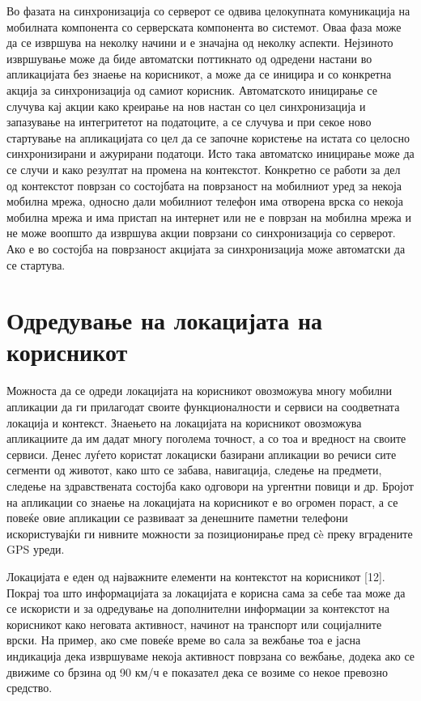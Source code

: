 Во фазата на синхронизација со серверот се одвива целокупната комуникација на
мобилната компонента со серверската компонента во системот. Оваа фаза може да се
извршува на неколку начини и е значајна од неколку аспекти. Нејзиното извршување
може да биде автоматски поттикнато од одредени настани во апликацијата без
знаење на корисникот, а може да се иницира и со конкретна акција за
синхронизација од самиот корисник. Автоматското иницирање се случува кај акции
како креирање на нов настан со цел синхронизација и запазување на интегритетот
на податоците, а се случува и при секое ново стартување на апликацијата со цел
да се започне користење на истата со целосно синхронизирани и ажурирани
податоци. Исто така автоматско иницирање може да се случи и како резултат на
промена на контекстот. Конкретно се работи за дел од контекстот поврзан со
состојбата на поврзаност на мобилниот уред за некоја мобилна мрежа, односно дали
мобилниот телефон има отворена врска со некоја мобилна мрежа и има пристап на
интернет или не е поврзан на мобилна мрежа и не може воопшто да извршува акции
поврзани со синхронизација со серверот. Ако е во состојба на поврзаност акцијата
за синхронизација може автоматски да се стартува.

\section{Одредување на локацијата на корисникот} 

Можноста да се одреди локацијата на корисникот овозможува многу мобилни
апликации да ги прилагодат своите функционалности и сервиси на соодветната
локација и контекст. Знаењето на локацијата на корисникот овозможува апликациите
да им дадат многу поголема точност, а со тоа и вредност на своите сервиси. Денес
луѓето користат локациски базирани апликации во речиси сите сегменти од животот,
како што се забава, навигација, следење на предмети, следење на здравствената
состојба како одговори на ургентни повици и др. Бројот на апликации со знаење на
локацијата на корисникот е во огромен пораст, а се повеќе овие апликации се
развиваат за денешните паметни телефони искористувајќи ги нивните можности за
позиционирање пред сè преку вградените GPS уреди.

Локацијата е еден од најважните елементи на контекстот на корисникот [12].
Покрај тоа што информацијата за локацијата е корисна сама за себе таа може да се
искористи и за одредување на дополнителни информации за контекстот на корисникот
како неговата активност, начинот на транспорт или социјалните врски. На пример,
ако сме повеќе време во сала за вежбање тоа е јасна индикација дека извршуваме
некоја активност поврзана со вежбање, додека ако се движиме со брзина од 90 км/ч
е показател дека се возиме со некое превозно средство.

